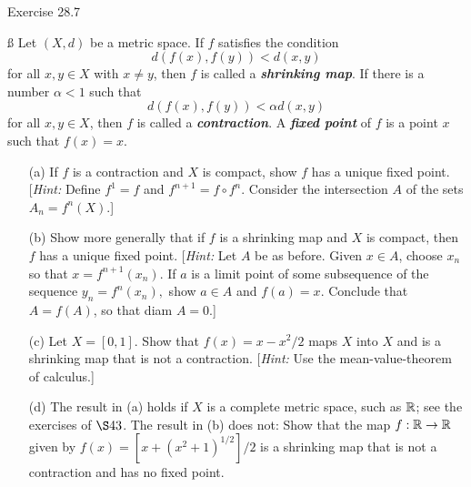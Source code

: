 \documentclass{hmwk}
\begin{document}
\begin{solution}
    
\end{solution}

\begin{problem}{Exercise 28.7}

    \ss
    \noindent Let $(X, d)$ be a metric space. If $f$ satisfies the condition $$d(f(x), f(y)) < d(x, y)$$ for all $x, y \in X$ with $x \neq y$, then $f$ is called a \textit{\textbf{shrinking map}}. If there is a number $\alpha < 1$ such that $$d(f(x), f(y)) < \alpha d(x, y)$$ for all $x, y \in X$, then $f$ is called a \textit{\textbf{contraction}}. A \textit{\textbf{fixed point}} of $f$ is a point $x$ such that $f(x) = x$.
    \begin{itemize}
        \item[(a)] If $f$ is a contraction and $X$ is compact, show $f$ has a unique fixed point. [\textit{Hint:} Define $f^1 = f$ and $f^{n+1} = f \circ f^n$. Consider the intersection $A$ of the sets $A_n = f^n(X)$.]
        \item[(b)] Show more generally that if $f$ is a shrinking map and $X$ is compact, then $f$ has a unique fixed point. [\textit{Hint:} Let $A$ be as before. Given $x \in A$, choose $x_n$ so that $x = f^{n+1}(x_n)$. If $a$ is a limit point of some subsequence of the sequence $y_n = f^n(x_n),$ show $a \in A$ and $f(a) = x$. Conclude that $A = f(A)$, so that diam $A = 0$.]
        \item[(c)] Let $X = [0, 1]$. Show that $f(x) = x - x^2/2$ maps $X$ into $X$ and is a shrinking map that is not a contraction. [\textit{Hint:} Use the mean-value-theorem of calculus.]
        \item[(d)] The result in (a) holds if $X$ is a complete metric space, such as $\mathbb{R}$; see the exercises of $\S 43$. The result in (b) does not: Show that the map $f: \mathbb{R} \rightarrow \mathbb{R}$ given by $f(x) = [x + (x^2 + 1)^{1/2}]/2$ is a shrinking map that is not a contraction and has no fixed point. 
    \end{itemize}
\end{problem}

\begin{solution}
    
\end{solution}
\end{document}
